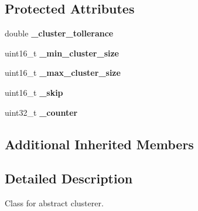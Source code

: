 \subsection*{Protected Attributes}
\begin{DoxyCompactItemize}
\item 
\mbox{\label{classdepth__clustering_1_1AbstractClusterer_ae219f21aefc118debe4fc89dfb0af96a}} 
double {\bfseries \+\_\+cluster\+\_\+tollerance}
\item 
\mbox{\label{classdepth__clustering_1_1AbstractClusterer_a7057f78c03aa9396850a61a92574f502}} 
uint16\+\_\+t {\bfseries \+\_\+min\+\_\+cluster\+\_\+size}
\item 
\mbox{\label{classdepth__clustering_1_1AbstractClusterer_ad11f0fd4ec9f7b83e9242d6fbbda0661}} 
uint16\+\_\+t {\bfseries \+\_\+max\+\_\+cluster\+\_\+size}
\item 
\mbox{\label{classdepth__clustering_1_1AbstractClusterer_a4cc536460eb6ffb1d13cf2eba8039602}} 
uint16\+\_\+t {\bfseries \+\_\+skip}
\item 
\mbox{\label{classdepth__clustering_1_1AbstractClusterer_a951128009a13fde1a391289b359cdad2}} 
uint32\+\_\+t {\bfseries \+\_\+counter}
\end{DoxyCompactItemize}
\subsection*{Additional Inherited Members}


\subsection{Detailed Description}
Class for abstract clusterer. 


